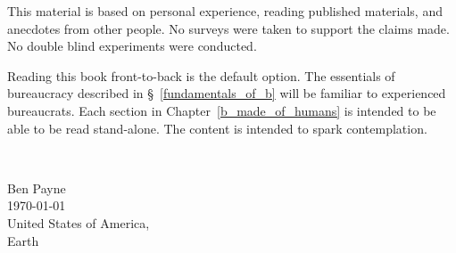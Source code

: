 This material is based on personal experience, reading published materials, and anecdotes from other people. No surveys were taken to support the claims made. No double blind experiments were conducted. 

Reading this book front-to-back is the default option. 
The essentials of bureaucracy described in \S~\ref{fundamentals_of_b} will be familiar to experienced bureaucrats. Each section in Chapter~\ref{b_made_of_humans} is intended to be able to be read stand-alone. The content is intended to spark contemplation. 

\ \\

\begin{flushright}
Ben Payne\\
\today\\
United States of America,\\
Earth
\end{flushright}


